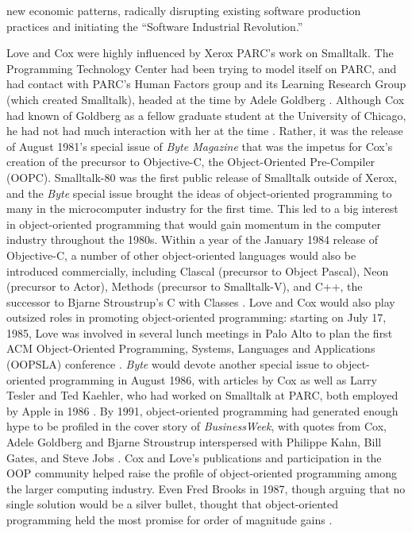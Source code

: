 \documentclass[acmsmall,screen]{acmart}
\begin{document}
new economic patterns, radically disrupting existing software production practices and initiating the ``Software Industrial Revolution.'' \citep[209--14]{cox_there_1990}

Love and Cox were highly influenced by Xerox PARC's work on Smalltalk. The Programming Technology Center had been trying to model itself on PARC, and had contact with PARC's Human Factors group and its Learning Research Group (which created Smalltalk), headed at the time by Adele Goldberg \citep[7--9]{love_skype_2019}. Although Cox had known of Goldberg as a fellow graduate student at the University of Chicago, he had not had much interaction with her at the time \citep[9--10]{cox_oral_2016}. Rather, it was the release of August 1981's special issue of \emph{Byte Magazine} \citep{xerox_learning_research_group_smalltalk-80_1981} that was the impetus for Cox's creation of the precursor to Objective-C, the Object-Oriented Pre-Compiler (OOPC). Smalltalk-80 was the first public release of Smalltalk outside of Xerox, and the \emph{Byte} special issue brought the ideas of object-oriented programming to many in the microcomputer industry for the first time. This led to a big interest in object-oriented programming that would gain momentum in the computer industry throughout the 1980s. Within a year of the January 1984 release of Objective-C, a number of other object-oriented languages would also be introduced commercially, including Clascal (precursor to Object Pascal), Neon (precursor to Actor), Methods (precursor to Smalltalk-V), and C++, the successor to Bjarne Stroustrup's C with Classes \citep[41]{love_object_1995}. Love and Cox would also play outsized roles in promoting object-oriented programming: starting on July 17, 1985, Love was involved in several lunch meetings in Palo Alto to plan the first ACM Object-Oriented Programming, Systems, Languages and Applications (OOPSLA) conference \citetext{\citealp[24]{love_object_1995}; \citealp[22--23]{love_skype_2019}}. \emph{Byte} would devote another special issue to object-oriented programming in August 1986, with articles by Cox as well as Larry Tesler and Ted Kaehler, who had worked on Smalltalk at PARC, both employed by Apple in 1986 \citep{cox_objects_1986,kaehler_small_1986,tesler_programming_1986}. By 1991, object-oriented programming had generated enough hype to be profiled in the cover story of \emph{BusinessWeek}, with quotes from Cox, Adele Goldberg and Bjarne Stroustrup interspersed with Philippe Kahn, Bill Gates, and Steve Jobs \citep{verity_software_1991}. Cox and Love's publications and participation in the OOP community helped raise the profile of object-oriented programming among the larger computing industry. Even Fred Brooks in 1987, though arguing that no single solution would be a silver bullet, thought that object-oriented programming held the most promise for order of magnitude gains \citep[14]{brooks_no_1987}.
\end{document}

